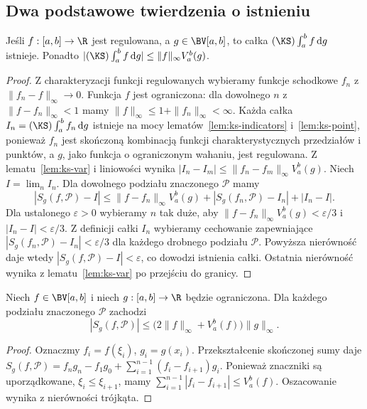 \subsection*{Dwa podstawowe twierdzenia o istnieniu}
\begin{twierdzenie}
\label{tw:ks-reg-bv}
Jeśli $f:[a,b]\to\R$ jest regulowana, a $g\in\BV[a,b]$, to całka $(\KS)\int_a^b f\,\mathrm dg$ istnieje. Ponadto
$|(\KS)\int_a^b f\,\mathrm dg|\le\|f\|_\infty V_a^b(g)$.
\end{twierdzenie}
\begin{proof}
Z charakteryzacji funkcji regulowanych wybieramy funkcje schodkowe $f_n$ z $\|f_n-f\|_\infty\to0$. Funkcja $f$ jest ograniczona: dla dowolnego $n$ z $\|f-f_n\|_\infty<1$ mamy $\|f\|_\infty\le1+\|f_n\|_\infty<\infty$. Każda całka $I_n=(\KS)\int_a^b f_n\,\mathrm dg$ istnieje na mocy lematów~\ref{lem:ks-indicators} i~\ref{lem:ks-point}, ponieważ $f_n$ jest skończoną kombinacją funkcji charakterystycznych przedziałów i punktów, a $g$, jako funkcja o ograniczonym wahaniu, jest regulowana. Z lematu~\ref{lem:ks-var} i liniowości wynika $|I_n-I_m|\le\|f_n-f_m\|_\infty V_a^b(g)$. Niech $I=\lim_n I_n$. Dla dowolnego podziału znaczonego $\mathcal P$ mamy
\[
 |S_g(f,\mathcal P)-I|\le
 \|f-f_n\|_\infty V_a^b(g)+|S_g(f_n,\mathcal P)-I_n|+|I_n-I|.
\]
Dla ustalonego $\varepsilon>0$ wybieramy $n$ tak duże, aby $\|f-f_n\|_\infty V_a^b(g)<\varepsilon/3$ i $|I_n-I|<\varepsilon/3$. Z definicji całki $I_n$ wybieramy cechowanie zapewniające $|S_g(f_n,\mathcal P)-I_n|<\varepsilon/3$ dla każdego drobnego podziału $\mathcal P$. Powyższa nierówność daje wtedy $|S_g(f,\mathcal P)-I|<\varepsilon$, co dowodzi istnienia całki. Ostatnia nierówność wynika z lematu~\ref{lem:ks-var} po przejściu do granicy.
\end{proof}

\begin{lemat}
\label{lem:ks-summation}
Niech $f\in\BV[a,b]$ i niech $g:[a,b]\to\R$ będzie ograniczona. Dla każdego podziału znaczonego $\mathcal P$ zachodzi
\[
 |S_g(f,\mathcal P)|\le
 \bigl(2\|f\|_\infty+V_a^b(f)\bigr)\|g\|_\infty.
\]
\end{lemat}
\begin{proof}
Oznaczmy $f_i=f(\xi_i)$, $g_i=g(x_i)$. Przekształcenie skończonej sumy daje
$S_g(f,\mathcal P)=f_ng_n-f_1g_0+\sum_{i=1}^{n-1}(f_i-f_{i+1})g_i$. Ponieważ znaczniki są uporządkowane, $\xi_i\le\xi_{i+1}$, mamy $\sum_{i=1}^{n-1}|f_i-f_{i+1}|\le V_a^b(f)$. Oszacowanie wynika z nierówności trójkąta.
\end{proof}

